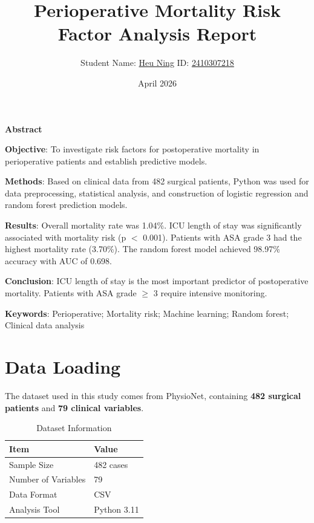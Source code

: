 \documentclass[12pt,a4paper]{article}
\title{\huge\textbf{Perioperative Mortality Risk Factor Analysis Report}}
\author{Student Name: \underline{Heu Ning}{\hspace{4cm}} \quad ID: \underline{2410307218}{\hspace{4cm}}}
\date{April 2026}
\begin{document}
\maketitle

\tableofcontents
\newpage

\begin{center}
    \textbf{\Large Abstract}
\end{center}

\textbf{Objective}: To investigate risk factors for postoperative mortality in perioperative patients and establish predictive models.

\textbf{Methods}: Based on clinical data from 482 surgical patients, Python was used for data preprocessing, statistical analysis, and construction of logistic regression and random forest prediction models.

\textbf{Results}: Overall mortality rate was 1.04\%. ICU length of stay was significantly associated with mortality risk (p $<$ 0.001). Patients with ASA grade 3 had the highest mortality rate (3.70\%). The random forest model achieved 98.97\% accuracy with AUC of 0.698.

\textbf{Conclusion}: ICU length of stay is the most important predictor of postoperative mortality. Patients with ASA grade $\geq$ 3 require intensive monitoring.

\vspace{0.5cm}
\textbf{Keywords}: Perioperative; Mortality risk; Machine learning; Random forest; Clinical data analysis

\newpage

\section{Data Loading}

The dataset used in this study comes from PhysioNet, containing \textbf{482 surgical patients} and \textbf{79 clinical variables}.

\begin{table}[H]
\centering
\caption{Dataset Information}
\begin{tabular}{ll}
\toprule
\textbf{Item} & \textbf{Value} \\
\midrule
Sample Size & 482 cases \\
Number of Variables & 79 \\
Data Format & CSV \\
Analysis Tool & Python 3.11 \\
\bottomrule
\end{tabular}
\end{table}
\end{document}
